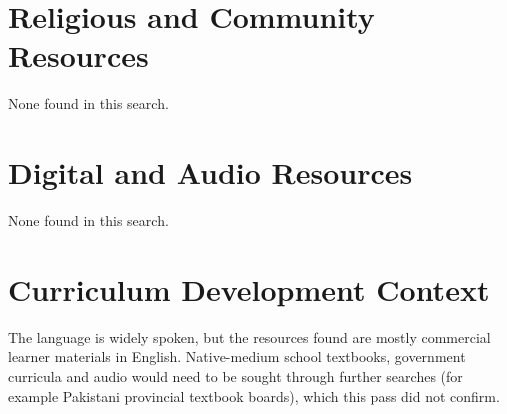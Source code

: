 \documentclass[12pt]{article}
\begin{document}
\section{Religious and Community Resources}
None found in this search.

\section{Digital and Audio Resources}
None found in this search.

\section{Curriculum Development Context}
The language is widely spoken, but the resources found are mostly commercial learner materials in English. Native-medium school textbooks, government curricula and audio would need to be sought through further searches (for example Pakistani provincial textbook boards), which this pass did not confirm.
\end{document}
